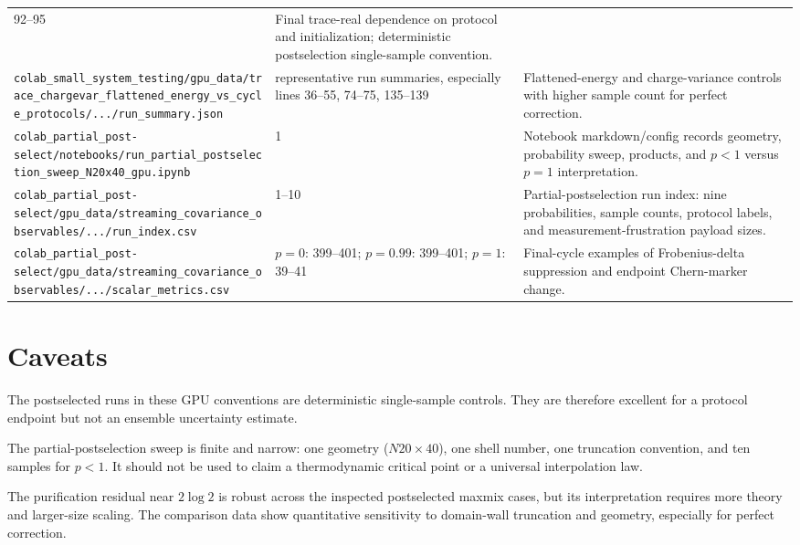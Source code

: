 \documentclass[aps,prb,onecolumn,nofootinbib,superscriptaddress]{revtex4-2}
\begin{document}
\begin{table}[h]
\begin{ruledtabular}
\begin{tabular}{p{}p{}p{}}
92--95
& Final trace-real dependence on protocol and initialization; deterministic
postselection single-sample convention. \\
\texttt{colab\_small\_system\_testing/gpu\_data/trace\_chargevar\_flattened\_energy\_vs\_cycle\_protocols/.../run\_summary.json}
& representative run summaries, especially lines 36--55, 74--75, 135--139
& Flattened-energy and charge-variance controls with higher sample count for
perfect correction. \\
\texttt{colab\_partial\_post-select/notebooks/run\_partial\_postselection\_sweep\_N20x40\_gpu.ipynb}
& 1
& Notebook markdown/config records geometry, probability sweep, products, and
$p<1$ versus $p=1$ interpretation. \\
\texttt{colab\_partial\_post-select/gpu\_data/streaming\_covariance\_observables/.../run\_index.csv}
& 1--10
& Partial-postselection run index: nine probabilities, sample counts, protocol
labels, and measurement-frustration payload sizes. \\
\texttt{colab\_partial\_post-select/gpu\_data/streaming\_covariance\_observables/.../scalar\_metrics.csv}
& $p=0$: 399--401; $p=0.99$: 399--401; $p=1$: 39--41
& Final-cycle examples of Frobenius-delta suppression and endpoint Chern-marker
change. \\
\end{tabular}
\end{ruledtabular}
\end{table}

\section{Caveats}

The postselected runs in these GPU conventions are deterministic single-sample
controls.  They are therefore excellent for a protocol endpoint but not an
ensemble uncertainty estimate.

The partial-postselection sweep is finite and narrow: one geometry
($N20\times40$), one shell number, one truncation convention, and ten samples for
$p<1$.  It should not be used to claim a thermodynamic critical point or a
universal interpolation law.

The purification residual near $2\log2$ is robust across the inspected
postselected maxmix cases, but its interpretation requires more theory and
larger-size scaling.  The comparison data show quantitative sensitivity to
domain-wall truncation and geometry, especially for perfect correction.
\end{document}

